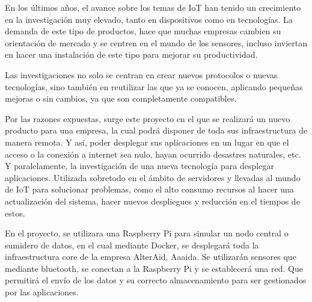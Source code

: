 \documentclass[spanish,final]{setup/eetac_tfc_pfc}
\begin{document}

\beforepreface  


\begin{resum}{10cm}
En los últimos años, el avance sobre los temas de IoT han tenido un crecimiento en la investigación muy elevado, tanto en dispositivos como en tecnologías. La demanda de este tipo de productos, hace que muchas empresas cambien su orientación de mercado y se centren en el mundo de los sensores, incluso inviertan en hacer una instalación de este tipo para mejorar su productividad.  
\newline 

Las investigaciones no solo se centran en crear nuevos protocolos o nuevas tecnologías, sino también en reutilizar las que ya se conocen, aplicando pequeñas mejoras o sin cambios, ya que son completamente compatibles. 
\newline

Por las razones expuestas, surge este proyecto en el que se realizará un nuevo producto para una empresa, la cual podrá disponer de toda sus infraestructura de manera remota. Y así, poder desplegar sus aplicaciones en un lugar en que el acceso o la conexión a internet sea nulo, hayan ocurrido desastres naturales, etc. Y paralelamente, la investigación de una nueva tecnología para desplegar aplicaciones. Utilizada sobretodo en el ámbito de servidores y llevadas al mundo de IoT para solucionar problemas, como el alto consumo recursos al hacer una actualización del sistema, hacer nuevos despliegues y reducción en el tiempos de estos.
\newline

En el proyecto, se utilizara una Raspberry Pi para simular un nodo central o sumidero de datos, en el cual mediante Docker, se desplegará toda la infraestructura core de la empresa AlterAid, Aaaida. Se utilizarán sensores que mediante bluetooth, se conectan a la Raspberry Pi y se establecerá una red. Que permitirá el envío de los datos y su correcto almacenamiento para ser gestionados por las aplicaciones.

\end{resum}
\end{document}
